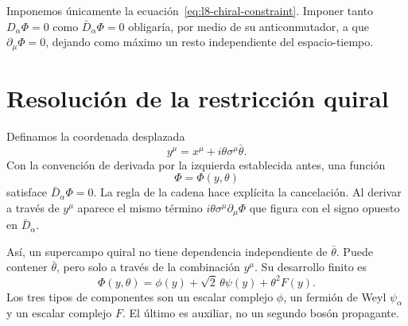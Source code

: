Imponemos únicamente la ecuación~\eqref{eq:l8-chiral-constraint}. Imponer tanto \(D_\alpha\Phi=0\) como \(\bar D_{\dot\alpha}\Phi=0\) obligaría, por medio de su anticonmutador, a que \(\partial_\mu\Phi=0\), dejando como máximo un resto independiente del espacio-tiempo.

\section{Resolución de la restricción quiral}

Definamos la coordenada desplazada
\begin{equation}
y^\mu=x^\mu+i\theta\sigma^\mu\bar\theta.
\label{eq:l8-chiral-coordinate}
\end{equation}
Con la convención de derivada por la izquierda establecida antes, una función
\begin{equation}
\Phi=\Phi(y,\theta)
\label{eq:l8-chiral-solution}
\end{equation}
satisface \(\bar D_{\dot\alpha}\Phi=0\). La regla de la cadena hace explícita la cancelación. Al derivar a través de \(y^\mu\) aparece el mismo término \(i\theta\sigma^\mu\partial_\mu\Phi\) que figura con el signo opuesto en \(\bar D_{\dot\alpha}\).

Así, un supercampo quiral no tiene dependencia independiente de \(\bar\theta\). Puede contener \(\bar\theta\), pero solo a través de la combinación \(y^\mu\). Su desarrollo finito es
\begin{equation}
\Phi(y,\theta)
=\phi(y)+\sqrt2\,\theta\psi(y)+\theta^2F(y).
\label{eq:l8-chiral-expansion-y}
\end{equation}
Los tres tipos de componentes son un escalar complejo \(\phi\), un fermión de Weyl \(\psi_\alpha\) y un escalar complejo \(F\). El último es auxiliar, no un segundo bosón propagante.

\begin{classroomqa}
\end{classroomqa}

